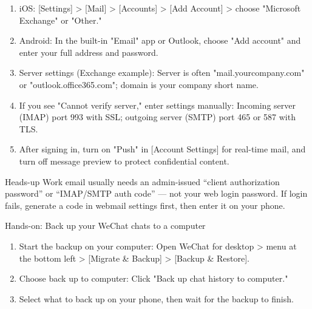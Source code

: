 
\begin{enumerate}
  \item iOS: [Settings] > [Mail] > [Accounts] > [Add Account] > choose "Microsoft Exchange" or "Other."
  \item Android: In the built-in "Email" app or Outlook, choose "Add account" and enter your full address and password.
  \item Server settings (Exchange example): Server is often "mail.yourcompany.com" or "outlook.office365.com"; domain is your company short name.
  \item If you see "Cannot verify server," enter settings manually: Incoming server (IMAP) port 993 with SSL; outgoing server (SMTP) port 465 or 587 with TLS.
  \item After signing in, turn on "Push" in [Account Settings] for real-time mail, and turn off message preview to protect confidential content.
\end{enumerate}

\begin{tcbinfo}{Heads-up}
Work email usually needs an admin-issued “client authorization password” or “IMAP/SMTP auth code” — not your web login password. If login fails, generate a code in webmail settings first, then enter it on your phone.

\end{tcbinfo}

\begin{tcbpractice}{Hands-on: Back up your WeChat chats to a computer}
\begin{enumerate}
  \item Start the backup on your computer: Open WeChat for desktop > menu at the bottom left > [Migrate \& Backup] > [Backup \& Restore].
  \item Choose back up to computer: Click "Back up chat history to computer."
  \item Select what to back up on your phone, then wait for the backup to finish.
\end{enumerate}

\end{tcbpractice}
